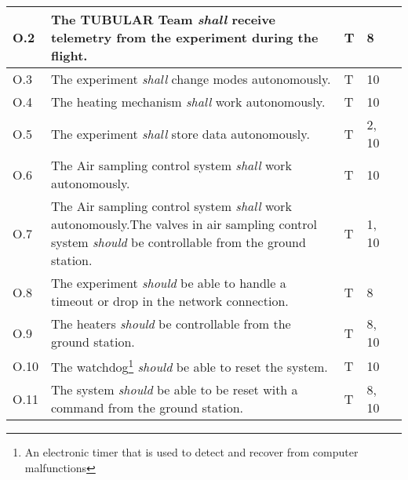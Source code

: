 \begin{longtable}[]{|m{}| m{} |m{} |m{}|m{}|}
O.2  & The TUBULAR Team \textit{shall} receive telemetry from the experiment during the flight.                                                                              &    T          & 8            &        \\ \hline
O.3  & The experiment \textit{shall} change modes autonomously.                                                                                                              &        T      & 10            &        \\ \hline
O.4  & The heating mechanism \textit{shall} work autonomously.                                                                                                               &        T      & 10            &        \\ \hline
O.5  & The experiment \textit{shall} store data autonomously.                                                                                                                &       T       & 2, 10            &        \\ \hline
O.6  & The Air sampling control system \textit{shall} work autonomously.                                                                                                     &        T      & 10            &        \\ \hline
O.7  & The Air sampling control system \textit{shall} work autonomously.The valves in air sampling control system \textit{should} be controllable from the ground station. &      T        & 1, 10            &        \\ \hline
O.8  & The experiment \textit{should} be able to handle a timeout or drop in the network connection.                                                                         &    T          &  8           &        \\ \hline
O.9  & The heaters \textit{should} be controllable from the ground station.                                                                                                  &     T         &  8, 10           &        \\ \hline
O.10 & The watchdog\footnote{An electronic timer that is used to detect and recover from computer malfunctions} \textit{should} be able to reset the system.               &     T         & 10            &        \\ \hline
O.11 & The system \textit{should} be able to be reset with a command from the ground station.                                                                                &     T         & 8, 10            &        \\ \hline

\end{longtable}
